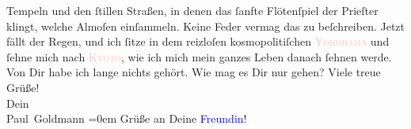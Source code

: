                 Tempeln und den ſtillen Straßen, in denen das ſanfte Flötenſpiel der Prieſter
               klingt, welche Almoſen einſammeln. Keine Feder vermag das zu beſchreiben. Jetzt fällt
               der Regen, und ich ſitze in dem reizloſen kosmopolitiſchen \textsc{\textcolor{pink}{Yokohama}{}\ledrightnote{\textcolor{pink}{Yokohama}}} und ſehne mich nach \textsc{\textcolor{pink}{Kyoto}{}\ledrightnote{\textcolor{pink}{Kyoto}}}, wie ich mich mein ganzes Leben danach ſehnen werde.\pend
           \pstart
           Von Dir habe ich lange nichts gehört. Wie mag es Dir nur gehen?\pend
           \pstart
           Viele treue Grüße! {\\[\baselineskip]}Dein {\\[\baselineskip]}\spacefill\mbox{Paul Goldmann}\pend
           \leftskip=0em{}\pstart
           \noindent{}Grüße an Deine \textcolor{blue}{Freundin}{}!\pend
           \endnumbering{}  
      